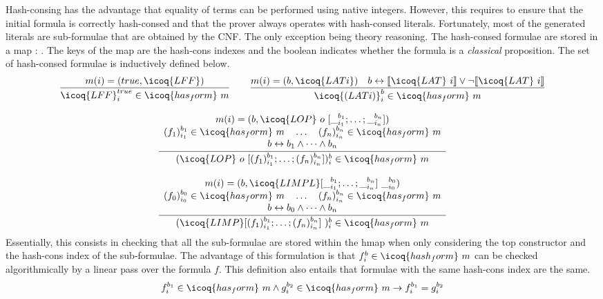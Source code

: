 \documentclass[utf8,a4paper,UKenglish,cleveref, autoref, thm-restate]{lipics-v2019}
\begin{document}
Hash-consing has the advantage that equality of terms can be performed
using native integers. However, this requires to ensure that the
initial formula is correctly hash-consed and that the prover always
operates with hash-consed literals. Fortunately, most of the generated
literals are sub-formulae that are obtained by the CNF. The only
exception being theory reasoning.
%
The hash-consed formulae are stored in a map  :
.  The keys of the map are the hash-cons indexes
and the boolean indicates whether the formula is a \emph{classical}
proposition. The set of hash-consed formulae  is
inductively defined below.
\[
  \begin{array}{c}
  \dfrac{m(i) = (true,\icoq{LFF})}
  {\icoq{LFF}_i^{true} \in \icoq{has_form}\ m }
  \qquad
  \dfrac{m(i) = (b,\icoq{LAT i}) \quad b \leftrightarrow \llbracket \icoq{LAT}\ i \rrbracket \lor \neg \llbracket \icoq{LAT}\ i \rrbracket }
  {\icoq{(LAT i)}_i^b \in \icoq{has_form}\ m }\\
    \\
    \dfrac{
    \begin{array}{c}
      m(i) = (b,\icoq{LOP}\ o\ [\__{i_1}^{b_1} ; \dots ; \__{i_n}^{b_n}]) \\
      (f_1)_{i_1}^{b_1} \in \icoq{has_form}\ m \quad \dots \quad (f_n)_{i_n}^{b_n} \in  \icoq{has_form}\ m\\
      b \leftrightarrow b_1 \land \dots \land b_n
    \end{array}}
    {(\icoq{LOP}\ o\  [(f_1)_{i_1}^{b_1}; \dots ; (f_n)_{i_n}^{b_n}])_i^b \in  \icoq{has_form}\ m
    }\\
    \\
    \dfrac{
    \begin{array}{c}
      m(i) = (b,\icoq{LIMPL} [\__{i_1}^{b_1} ; \dots ; \__{i_n}^{b_n}]\ \__{i_0}^{b_0}) \\
      (f_0)_{i_0}^{b_0} \in \icoq{has_form}\ m \quad \dots \quad (f_n)_{i_n}^{b_n} \in  \icoq{has_form}\ m\\
      b \leftrightarrow b_0 \land \dots \land b_n
    \end{array}}
    {(\icoq{LIMP} [(f_1)_{i_1}^{b_1}; \dots ; (f_n)_{i_n}^{b_n}]\ )_i^b \in  \icoq{has_form}\ m
    }
  \end{array}    
\]
Essentially, this consists in checking that all the sub-formulae are
stored within the hmap  when only considering the top
constructor and the hash-cons index of the sub-formulae.
%
The advantage of this formulation is that
$f_i^b \in \icoq{hash_form}\ m$ can be checked algorithmically by a
linear pass over the formula $f$.
%
This definition also entails that formulae with the same hash-cons index are the same.
\[
f_i^{b_1} \in \icoq{has_form}\ m \land g_i^{b_2} \in \icoq{has_form}\ m \to  f_i^{b_1} = g_i^{b_2}
\]
\end{document}

